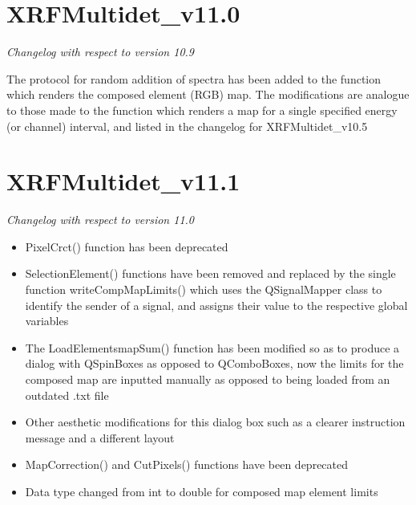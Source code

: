 \documentclass[a4paper,12pt]{article}
\begin{document}
\section{XRFMultidet\_v11.0}
\textit{Changelog with respect to version 10.9}

The protocol for random addition of spectra has been added to the function which renders the composed element (RGB) map. The modifications are analogue to those made to the function which renders a map for a single specified energy (or channel) interval, and listed in the changelog for XRFMultidet\_v10.5

\section{XRFMultidet\_v11.1}
\textit{Changelog with respect to version 11.0}

\begin{itemize}
	\item PixelCrct() function has been deprecated
	\item SelectionElement() functions have been removed and replaced by the single function writeCompMapLimits() which uses the QSignalMapper class to identify the sender of a signal, and assigns their value to the respective global variables
	\item The LoadElementsmapSum() function has been modified so as to produce a dialog with QSpinBoxes as opposed to QComboBoxes, now the limits for the composed map are inputted manually as opposed to being loaded from an outdated .txt file
	\item Other aesthetic modifications for this dialog box such as a clearer instruction message and a different layout
	\item MapCorrection() and CutPixels() functions have been deprecated
	\item Data type changed from int to double for composed map element limits
\end{itemize}
\end{document}
